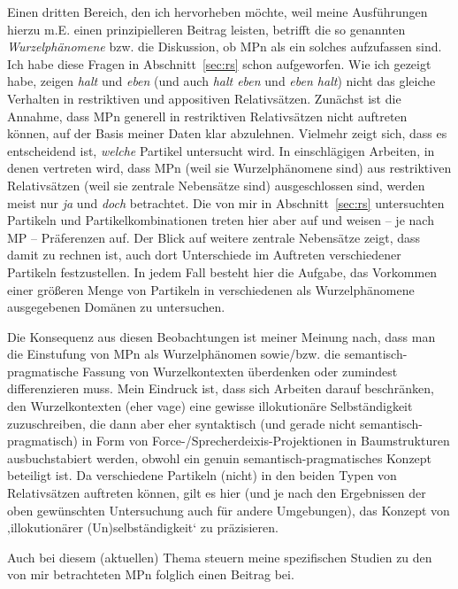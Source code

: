 \noindent
Einen dritten Bereich, den ich hervorheben möchte, weil meine Ausführungen hierzu m.E. einen prinzipielleren Beitrag leisten, betrifft die so genannten \textit{Wurzel\-phänomene} bzw. die Diskussion, ob MPn als ein solches aufzufassen sind. Ich habe diese Fragen in Abschnitt~\ref{sec:rs} schon aufgeworfen. Wie ich gezeigt habe, zeigen \textit{halt} und \textit{eben} (und auch \textit{halt eben} und \textit{eben halt}) nicht das gleiche Verhalten in restriktiven und appositiven Relativsätzen. Zunächst ist die Annahme, dass MPn generell in restriktiven Relativsätzen nicht auftreten können, auf der Basis meiner Daten klar abzulehnen. Vielmehr zeigt sich, dass es entscheidend ist, \emph{welche} Partikel untersucht wird. In einschlägigen Arbeiten, in denen vertreten wird, dass MPn (weil sie Wurzelphänomene sind) aus restriktiven Relativsätzen (weil sie zentrale Nebensätze  sind) ausgeschlossen sind, werden meist nur \textit{ja} und \textit{doch} betrachtet. Die von mir in Abschnitt~\ref{sec:rs} untersuchten Partikeln und Partikelkombinationen treten hier aber auf und weisen – je nach MP – Präferenzen auf. Der Blick auf weitere zentrale Nebensätze zeigt, dass damit zu rechnen ist, auch dort Unterschiede im Auftreten verschiedener Partikeln festzustellen. In jedem Fall besteht hier die Aufgabe, das Vorkommen einer größeren Menge von Partikeln in verschiedenen als Wurzelphänomene ausgegebenen Domänen zu untersuchen.

Die Konsequenz aus diesen Beobachtungen ist meiner Meinung nach, dass man die Einstufung von MPn als Wurzelphänomen sowie/bzw. die semantisch-pragmatische Fassung von Wurzelkontexten überdenken oder zumindest differenzieren muss. Mein Eindruck ist, dass sich Arbeiten darauf beschränken, den Wurzelkontexten (eher vage) eine gewisse illokutionäre Selbständigkeit zuzuschreiben, die dann aber eher syntaktisch (und gerade nicht semantisch-pragma\-tisch) in Form von Force-/Sprecherdeixis-Projektionen in Baumstrukturen ausbuchstabiert werden, obwohl ein genuin semantisch-pragmatisches Konzept beteiligt ist. Da verschiedene Partikeln (nicht) in den beiden Typen von Relativsätzen auftreten können, gilt es hier (und je nach den Ergebnissen der oben gewünschten Untersuchung auch für andere Umgebungen), das Konzept von ‚illokutionärer (Un)selbständig\-keit‘ zu präzisieren. 
	
Auch bei diesem (aktuellen) Thema steuern meine spezifischen Studien zu den von mir betrachteten MPn folglich einen Beitrag bei.\\

